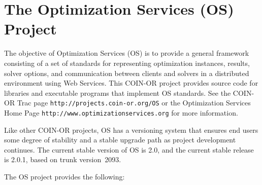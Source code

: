 \documentclass[11pt]{article}
\renewcommand{\_}{{\char"5F}}
\renewcommand{\{}{{\char"7B}}
\renewcommand{\}}{{\char"7D}}
\renewcommand{\^}{{\char"0D}}
\renewcommand{\'}{{\char"0D}}
\newcommand{\UrlOs}{http://www.optimizationservices.org}
\newcommand{\UrlTrac}{http://projects.coin-or.org/OS}
\newcommand{\OSstable}{2.0}
\newcommand{\OSrelease}{2.0.1}
\newcommand{\OStrunk}{2093}
\begin{document}
\newpage
\tableofcontents
\listoffigures
\listoftables
{}



\newpage

\section{The Optimization Services (OS) Project}

The objective of Optimization Services (OS) is to provide a general framework consisting of a set of standards
for representing optimization instances, results, solver options, and communication between clients and solvers
in a distributed environment using Web Services. This COIN-OR project provides source code for libraries and
executable programs that implement OS standards.  See the COIN-OR Trac page {\tt\UrlTrac}
or the Optimization Services Home Page {\tt\UrlOs} for more information.

Like other COIN-OR projects, OS has a versioning system that ensures end users some degree of stability 
and a stable upgrade path as project development continues. The current stable version of OS is \OSstable, 
and the current stable release is \OSrelease{}, based on trunk version~\OStrunk.

The OS project provides the following:
\end{document}
